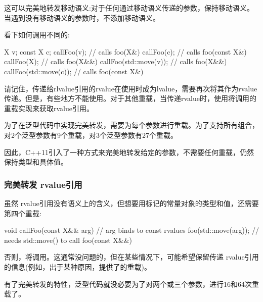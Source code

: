 这可以完美地转发移动语义:对于任何通过移动语义传递的参数，保持移动语义。当遇到没有移动语义的参数时，不添加移动语义。

看下如何调用不同的:

\begin{cppcode}
X v;
const X c;
callFoo(v); // calls foo(X&)
callFoo(c); // calls foo(const X&)
callFoo(X{}); // calls foo(X&&)
callFoo(std::move(v)); // calls foo(X&&)
callFoo(std::move(c)); // calls foo(const X&)
\end{cppcode}

请记住，传递给rlvalue引用的rvalue在使用时成为lvalue，需要再次将其作为rvalue传递。但是，有些地方不能使用。对于其他重载，当传递rvalue时，使用将调用的重载实现来获取rvalue引用。

为了在泛型代码中实现完美转发，需要为每个参数进行重载。为了支持所有组合，对2个泛型参数有9个重载，对3个泛型参数有27个重载。

因此，C++11引入了一种方式来完美地转发给定的参数，不需要任何重载，仍然保持类型和具体值。

\subsubsection{完美转发 rvalue引用}

虽然 rvalue引用没有语义上的含义，但想要用标记的常量对象的类型和值，还需要第四个重载:

\begin{cppcode}
void callFoo(const X&& arg) { // arg binds to const rvalues
	foo(std::move(arg)); // needs std::move() to call foo(const X&&)
}
\end{cppcode}

否则，将调用。这通常没问题的，但在某些情况下，可能希望保留传递 rvalue引用的信息(例如，出于某种原因，提供了的重载)。

有了完美转发的特性，泛型代码就没必要为了对两个或三个参数，进行16和64次重载了。


















